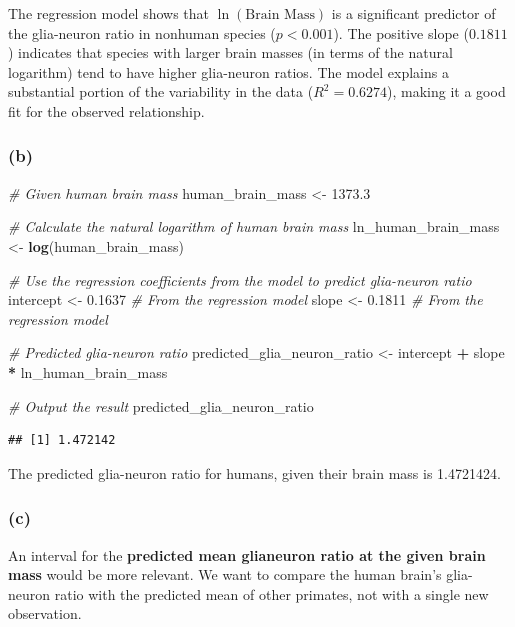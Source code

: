 \documentclass[
]{article}
\newenvironment{Shaded}{\begin{snugshade}}{\end{snugshade}}
\newcommand{\CommentTok}[1]{\textcolor[rgb]{0.56,0.35,0.01}{\textit{#1}}}
\newcommand{\FloatTok}[1]{\textcolor[rgb]{0.00,0.00,0.81}{#1}}
\newcommand{\FunctionTok}[1]{\textcolor[rgb]{0.13,0.29,0.53}{\textbf{#1}}}
\newcommand{\NormalTok}[1]{#1}
\newcommand{\OtherTok}[1]{\textcolor[rgb]{0.56,0.35,0.01}{#1}}
\newcommand{\SpecialCharTok}[1]{\textcolor[rgb]{0.81,0.36,0.00}{\textbf{#1}}}
\begin{document}
The regression model shows that \(\ln(\text{Brain Mass})\) is a
significant predictor of the glia-neuron ratio in nonhuman species
(\(p < 0.001\)). The positive slope (\(0.1811\)) indicates that species
with larger brain masses (in terms of the natural logarithm) tend to
have higher glia-neuron ratios. The model explains a substantial portion
of the variability in the data (\(R^2 = 0.6274\)), making it a good fit
for the observed relationship.

\subsubsection{(b)}\label{b}

\begin{Shaded}
\begin{Highlighting}[]
\CommentTok{\# Given human brain mass}
\NormalTok{human\_brain\_mass }\OtherTok{\textless{}{-}} \FloatTok{1373.3}

\CommentTok{\# Calculate the natural logarithm of human brain mass}
\NormalTok{ln\_human\_brain\_mass }\OtherTok{\textless{}{-}} \FunctionTok{log}\NormalTok{(human\_brain\_mass)}

\CommentTok{\# Use the regression coefficients from the model to predict glia{-}neuron ratio}
\NormalTok{intercept }\OtherTok{\textless{}{-}} \FloatTok{0.1637}  \CommentTok{\# From the regression model}
\NormalTok{slope }\OtherTok{\textless{}{-}} \FloatTok{0.1811}      \CommentTok{\# From the regression model}

\CommentTok{\# Predicted glia{-}neuron ratio}
\NormalTok{predicted\_glia\_neuron\_ratio }\OtherTok{\textless{}{-}}\NormalTok{ intercept }\SpecialCharTok{+}\NormalTok{ slope }\SpecialCharTok{*}\NormalTok{ ln\_human\_brain\_mass}

\CommentTok{\# Output the result}
\NormalTok{predicted\_glia\_neuron\_ratio}
\end{Highlighting}
\end{Shaded}

\begin{verbatim}
## [1] 1.472142
\end{verbatim}

The predicted glia-neuron ratio for humans, given their brain mass is
1.4721424.

\subsubsection{(c)}\label{c}

An interval for the \textbf{predicted mean glianeuron ratio at the given
brain mass} would be more relevant. We want to compare the human brain's
glia-neuron ratio with the predicted mean of other primates, not with a
single new observation.
\end{document}
